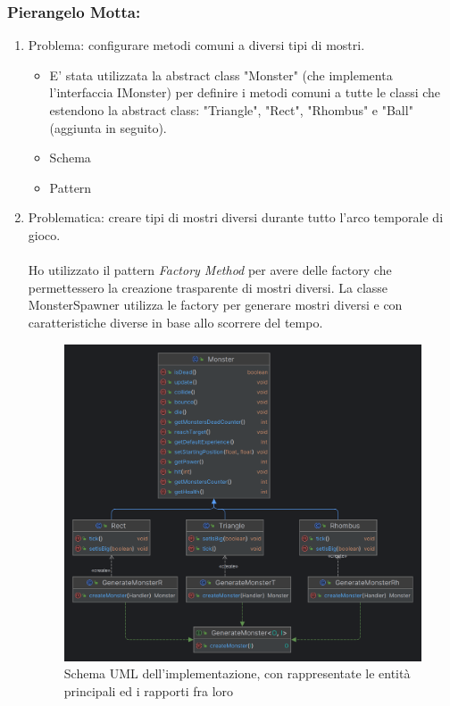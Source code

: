 \documentclass[a4paper,12pt]{report}
\begin{document}
\subsubsection*{Pierangelo Motta:}
%
\begin{enumerate}
\item Problema: configurare metodi comuni a diversi tipi di mostri.
\begin{itemize}
	\item E' stata utilizzata la abstract class "Monster" (che implementa l'interfaccia IMonster) per definire i metodi comuni a tutte le classi che estendono la abstract class: "Triangle", "Rect", "Rhombus" e "Ball"(aggiunta in seguito).
	\item Schema
	\item Pattern
\end{itemize}

\item Problematica: creare tipi di mostri diversi durante tutto l'arco temporale di gioco.	
\paragraph*{}
Ho utilizzato il pattern \emph{Factory Method} per avere delle factory che permettessero la creazione trasparente di mostri diversi. La classe MonsterSpawner utilizza le factory per generare mostri diversi e con caratteristiche diverse in base allo scorrere del tempo.

\begin{figure}[H]
	\centering{}
\includegraphics[width=\textwidth]{img/GenerateMonsters.png}
	\caption{Schema UML dell'implementazione, con rappresentate le entità principali ed i rapporti fra loro}
\label{img:Generate Monsters}
\end{figure}


\end{enumerate}
\end{document}
